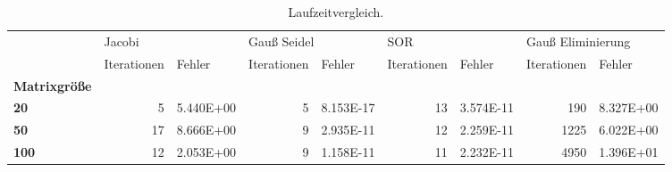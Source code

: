 \begin{table}[h!]
\centering
\caption{Laufzeitvergleich.}
\label{laufzeit}
\begin{tabular}{lrlrlrlrl}
\toprule
{} & \multicolumn{2}{l}{Jacobi} & \multicolumn{2}{l}{Gauß Seidel} & \multicolumn{2}{l}{SOR} & \multicolumn{2}{l}{Gauß Eliminierung} \\
{} & Iterationen &     Fehler & Iterationen &     Fehler & Iterationen &     Fehler &       Iterationen &     Fehler \\
\textbf{Matrixgröße} &             &            &             &            &             &            &                   &            \\
\midrule
\textbf{20         } &           5 &  5.440E+00 &           5 &  8.153E-17 &          13 &  3.574E-11 &               190 &  8.327E+00 \\
\textbf{50         } &          17 &  8.666E+00 &           9 &  2.935E-11 &          12 &  2.259E-11 &              1225 &  6.022E+00 \\
\textbf{100        } &          12 &  2.053E+00 &           9 &  1.158E-11 &          11 &  2.232E-11 &              4950 &  1.396E+01 \\
\bottomrule
\end{tabular}
\end{table}
